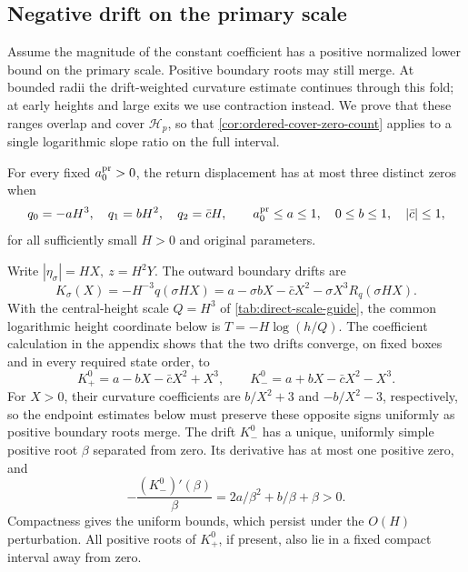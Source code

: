 \subsection{Negative drift on the primary scale}
\label{sec:direct-primary-negative}

Assume the magnitude of the constant coefficient has a positive
normalized lower bound on the primary scale. Positive boundary roots
may still merge. At bounded radii the drift-weighted curvature estimate
continues through this fold; at early heights and large exits we use
contraction instead. We prove that these ranges overlap and cover
\(\mathcal H_p\), so that \cref{cor:ordered-cover-zero-count} applies
to a single logarithmic slope ratio on the full interval.

\begin{proposition}
\label{prop:direct-primary-negative}
For every fixed \(a_0^{\rm pr}>0\), the return displacement has at
most three distinct zeros when
\begin{equation}
\label{eq:direct-primary-region}
 q_0=-aH^3,\quad q_1=bH^2,\quad q_2=\bar c H,\qquad
 a_0^{\rm pr}\le a\le1,\quad 0\le b\le1,\quad |\bar c|\le1,
\end{equation}
for all sufficiently small \(H>0\) and original parameters.
\end{proposition}

Write \(|\eta_\sigma|=HX,\ z=H^2Y\). The outward
boundary drifts are
\begin{equation}
\label{eq:direct-primary-drifts}
 K_\sigma(X)=-H^{-3}q(\sigma HX)
 =a-\sigma bX-\bar c X^2-\sigma X^3R_q(\sigma HX).
\end{equation}
With the central-height scale \(Q=H^3\) of \cref{tab:direct-scale-guide},
the common logarithmic height coordinate below is \(T=-H\log(h/Q)\).
The coefficient calculation in the appendix shows that the two
drifts converge, on fixed boxes and in every required state order, to
\[
 K_+^0=a-bX-\bar c X^2+X^3,\qquad
 K_-^0=a+bX-\bar c X^2-X^3.
\]
For \(X>0\), their curvature coefficients are \(b/X^2+3\) and \(-b/X^2-3\),
respectively, so the endpoint estimates below must preserve these
opposite signs uniformly as positive boundary roots merge.
The drift \(K_-^0\) has a unique, uniformly simple positive root \(\beta\)
separated from zero. Its derivative has at most one positive
zero, and
\[
 -\frac{(K_-^0)'(\beta)}{\beta}
        =2a/\beta^2+b/\beta+\beta>0 .
\]
Compactness gives the uniform bounds, which persist under the
\(O(H)\) perturbation. All positive roots of \(K_+^0\), if
present, also lie in a fixed compact interval away from zero.

